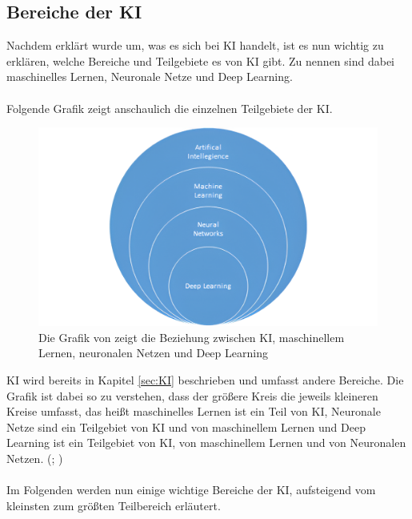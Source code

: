 \documentclass[12pt,toc=bib,toc=listof]{scrreprt}
\begin{document}
\subsection{Bereiche der KI} %
\label{sec:bereicheDerKI}
Nachdem erklärt wurde um, was es sich bei KI handelt, ist es nun wichtig zu erklären, welche Bereiche und Teilgebiete es von KI gibt. Zu nennen sind dabei maschinelles Lernen, Neuronale Netze und Deep Learning.\\
\\
Folgende Grafik zeigt anschaulich die einzelnen Teilgebiete der KI.
\begin{figure} [H]
    \centering
    \includegraphics[width=0.75\linewidth]{./Bilder/Mocko_Die Beziehung zwischen KI, maschinellem Lernen, neuronalen Netzen und Deep Learning.png}
    \caption{Die Grafik von \textcite{Mocko2021} zeigt die Beziehung zwischen KI, maschinellem Lernen, neuronalen Netzen und Deep Learning}
    \label{fig:enter-label}
\end{figure}
\noindent KI wird bereits in Kapitel \ref{sec:KI}  beschrieben und umfasst andere Bereiche. Die Grafik ist dabei so zu verstehen, dass der größere Kreis die jeweils kleineren Kreise umfasst, das heißt maschinelles Lernen ist ein Teil von KI, Neuronale Netze sind ein Teilgebiet von KI und von maschinellem Lernen und Deep Learning ist ein Teilgebiet von KI, von maschinellem Lernen und von Neuronalen Netzen. (\cite{Bhatt2021}; \cite{Zhu2021})\\
\\
Im Folgenden werden nun einige wichtige Bereiche der KI, aufsteigend vom kleinsten zum größten Teilbereich erläutert.\\
\newpage
\end{document}
